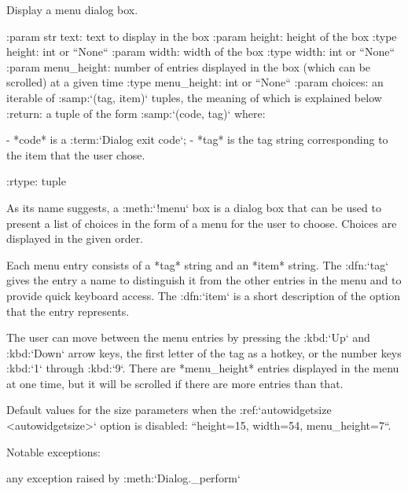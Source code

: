 \begin{DoxyVerb}Display a menu dialog box.

:param str text:        text to display in the box
:param height:      height of the box
:type height:       int or ``None``
:param width:       width of the box
:type width:        int or ``None``
:param menu_height: number of entries displayed in the box
            (which can be scrolled) at a given time
:type menu_height:  int or ``None``
:param choices:     an iterable of :samp:`({tag}, {item})`
            tuples, the meaning of which is explained
            below
:return: a tuple of the form :samp:`({code}, {tag})` where:

  - *code* is a :term:`Dialog exit code`;
  - *tag* is the tag string corresponding to the item that the
    user chose.

:rtype: tuple

As its name suggests, a :meth:`!menu` box is a dialog box that
can be used to present a list of choices in the form of a menu
for the user to choose. Choices are displayed in the given
order.

Each menu entry consists of a *tag* string and an *item* string.
The :dfn:`tag` gives the entry a name to distinguish it from the
other entries in the menu and to provide quick keyboard access.
The :dfn:`item` is a short description of the option that the
entry represents.

The user can move between the menu entries by pressing the
:kbd:`Up` and :kbd:`Down` arrow keys, the first letter of the
tag as a hotkey, or the number keys :kbd:`1` through :kbd:`9`.
There are *menu_height* entries displayed in the menu at one
time, but it will be scrolled if there are more entries than
that.

Default values for the size parameters when the
:ref:`autowidgetsize <autowidgetsize>` option is disabled:
``height=15, width=54, menu_height=7``.

Notable exceptions:

  any exception raised by :meth:`Dialog._perform`\end{DoxyVerb}
